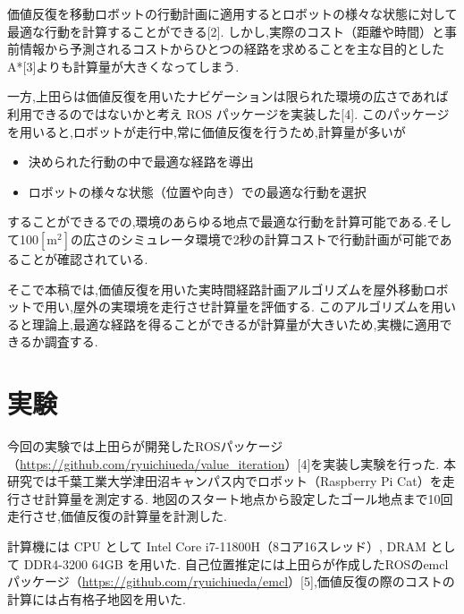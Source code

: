 \documentclass{jarticle}
\begin{document}
価値反復を移動ロボットの行動計画に適用するとロボットの様々な状態に対して最適な行動を計算することができる[2].
しかし,実際のコスト（距離や時間）と事前情報から予測されるコストからひとつの経路を求めることを主な目的とした A*[3]よりも計算量が大きくなってしまう.

一方,上田らは価値反復を用いたナビゲーションは限られた環境の広さであれば利用できるのではないかと考え ROS パッケージを実装した[4].
このパッケージを用いると,ロボットが走行中,常に価値反復を行うため,計算量が多いが
\begin{itemize}
	\item 決められた行動の中で最適な経路を導出
	\item ロボットの様々な状態（位置や向き）での最適な行動を選択
 \end{itemize}
することができるでの,環境のあらゆる地点で最適な行動を計算可能である.そして100$\mathrm{[m^2]}$の広さのシミュレータ環境で2秒の計算コストで行動計画が可能であることが確認されている.

そこで本稿では,価値反復を用いた実時間経路計画アルゴリズムを屋外移動ロボットで用い,屋外の実環境を走行させ計算量を評価する.
このアルゴリズムを用いると理論上,最適な経路を得ることができるが計算量が大きいため,実機に適用できるか調査する.



\section{実験}%
今回の実験では上田らが開発したROSパッケージ（\href{https://github.com/ryuichiueda/value_iteration}{https://github.com/ryuichiueda/value\_iteration}）[4]を実装し実験を行った.
本研究では千葉工業大学津田沼キャンパス内でロボット（Raspberry Pi Cat）を走行させ計算量を測定する.
地図のスタート地点から設定したゴール地点まで10回走行させ,価値反復の計算量を計測した.

計算機には CPU として Intel Core i7-11800H（8コア16スレッド）, DRAM として DDR4-3200 64GB を用いた.
自己位置推定には上田らが作成したROSのemclパッケージ（\href{https://github.com/ryuichiueda/emcl}{https://github.com/ryuichiueda/emcl}）[5],価値反復の際のコストの計算には占有格子地図を用いた.
\end{document}
